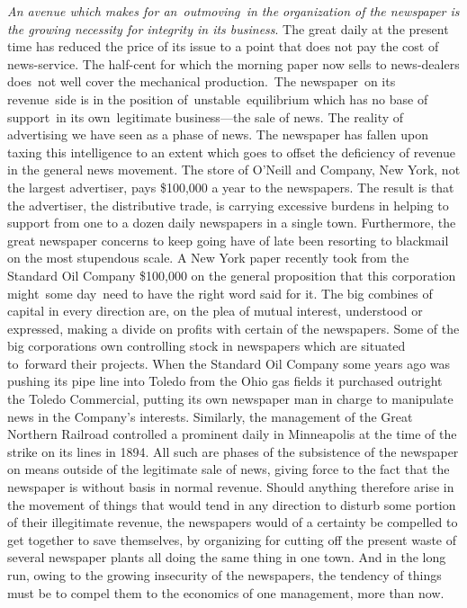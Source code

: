 \documentclass[openany,nobib]{tufte-book}
\begin{document}
\emph{An avenue which makes for an~outmoving~in the organization of the
newspaper is the growing necessity for integrity in its business}. The
great daily at the present time has reduced the price of its issue to a
point that does not pay the cost of news-service. The half-cent for
which the morning paper now sells to news-dealers does~not well cover
the mechanical production.~The newspaper~on its revenue~side is in the
position of~unstable~equilibrium which has no base of support~in its
own~legitimate business---the sale of news. The reality of advertising
we have seen as a phase of news. The newspaper has fallen upon taxing
this intelligence to an extent which goes to offset the deficiency of
revenue in the general news movement. The store of O'Neill and Company,
New York, not the largest advertiser, pays \$100,000 a year to the
newspapers. The result is that the advertiser, the distributive trade,
is carrying excessive burdens in helping to support from one to a dozen
daily newspapers in a single town. Furthermore, the great newspaper
concerns to keep going have of late been resorting to blackmail on the
most stupendous scale. A New York paper recently took from the Standard
Oil Company \$100,000 on the general proposition that this corporation
might~some day~need to have the right word said for it. The big combines
of capital in every direction are, on the plea of mutual interest,
understood or expressed, making a divide on profits with certain of the
newspapers. Some of the big corporations own controlling stock in
newspapers which are situated to~forward their projects. When the
Standard Oil Company some years ago was pushing its pipe line into
Toledo from the Ohio gas fields it purchased outright the Toledo
Commercial, putting its own newspaper man in charge to manipulate news
in the Company's interests. Similarly, the management of the Great
Northern Railroad controlled a prominent daily in Minneapolis at the
time of the strike on its lines in 1894. All such are phases of the
subsistence of the newspaper on means outside of the legitimate sale of
news, giving force to the fact that the newspaper is without basis in
normal revenue. Should anything therefore arise in the movement of
things that would tend in any direction to disturb some portion of their
illegitimate revenue, the newspapers would of a certainty be compelled
to get together to save themselves, by organizing for cutting off the
present waste of several newspaper plants all doing the same thing in
one town. And in the long run, owing to the growing insecurity of the
newspapers, the tendency of things must be to compel them to the
economics of one management, more than now.~
\end{document}
